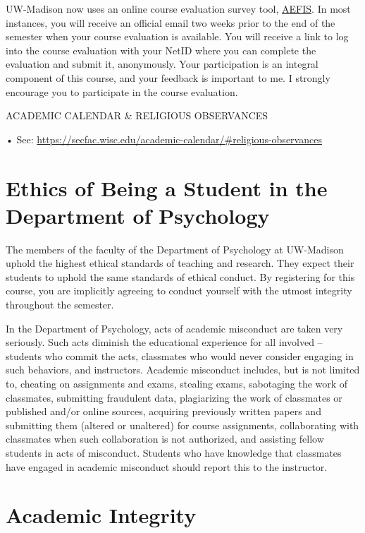 \documentclass[11pt,man]{article}
\begin{document}
UW-Madison now uses an online course evaluation survey tool,
\href{https://assessment.provost.wisc.edu/course-evaluation-surveys/}{AEFIS}.
In most instances, you will receive an official email two weeks prior to
the end of the semester when your course evaluation is available. You
will receive a link to log into the course evaluation with your NetID
where you can complete the evaluation and submit it, anonymously. Your
participation is an integral component of this course, and your feedback
is important to me. I strongly encourage you to participate in the
course evaluation.

ACADEMIC CALENDAR \& RELIGIOUS OBSERVANCES

• See:
\url{https://secfac.wisc.edu/academic-calendar/\#religious-observances}

\hypertarget{ethics-of-being-a-student-in-the-department-of-psychology}{%
\section{Ethics of Being a Student in the Department of
Psychology}\label{ethics-of-being-a-student-in-the-department-of-psychology}}

The members of the faculty of the Department of Psychology at UW-Madison
uphold the highest ethical standards of teaching and research. They
expect their students to uphold the same standards of ethical conduct.
By registering for this course, you are implicitly agreeing to conduct
yourself with the utmost integrity throughout the semester.

In the Department of Psychology, acts of academic misconduct are taken
very seriously. Such acts diminish the educational experience for all
involved -- students who commit the acts, classmates who would never
consider engaging in such behaviors, and instructors. Academic
misconduct includes, but is not limited to, cheating on assignments and
exams, stealing exams, sabotaging the work of classmates, submitting
fraudulent data, plagiarizing the work of classmates or published and/or
online sources, acquiring previously written papers and submitting them
(altered or unaltered) for course assignments, collaborating with
classmates when such collaboration is not authorized, and assisting
fellow students in acts of misconduct. Students who have knowledge that
classmates have engaged in academic misconduct should report this to the
instructor.

\hypertarget{academic-integrity}{%
\section{Academic Integrity}\label{academic-integrity}}
\end{document}
